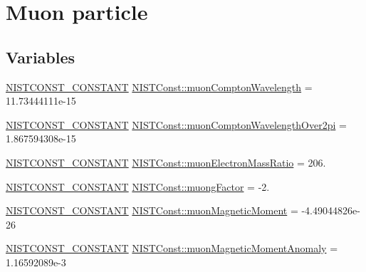\hypertarget{group___n_i_s_t_const-_muon}{}\section{Muon particle}
\label{group___n_i_s_t_const-_muon}
\subsection*{Variables}
\begin{DoxyCompactItemize}
\item 
\mbox{\hyperlink{group___n_i_s_t_const-_macros_ga2b0fc1d7452373f816175dd86ce26729}{N\+I\+S\+T\+C\+O\+N\+S\+T\+\_\+\+C\+O\+N\+S\+T\+A\+NT}} \mbox{\hyperlink{group___n_i_s_t_const-_muon_gafa8e9fc422ec4dab36ec7fed34c4b1b0}{N\+I\+S\+T\+Const\+::muon\+Compton\+Wavelength}} = 11.\+73444111e-\/15
\item 
\mbox{\hyperlink{group___n_i_s_t_const-_macros_ga2b0fc1d7452373f816175dd86ce26729}{N\+I\+S\+T\+C\+O\+N\+S\+T\+\_\+\+C\+O\+N\+S\+T\+A\+NT}} \mbox{\hyperlink{group___n_i_s_t_const-_muon_ga7c9ea95beb94545d850a0ffa09c08630}{N\+I\+S\+T\+Const\+::muon\+Compton\+Wavelength\+Over2pi}} = 1.\+867594308e-\/15
\item 
\mbox{\hyperlink{group___n_i_s_t_const-_macros_ga2b0fc1d7452373f816175dd86ce26729}{N\+I\+S\+T\+C\+O\+N\+S\+T\+\_\+\+C\+O\+N\+S\+T\+A\+NT}} \mbox{\hyperlink{group___n_i_s_t_const-_muon_ga66653799cefd4fb005dabc4be673ad74}{N\+I\+S\+T\+Const\+::muon\+Electron\+Mass\+Ratio}} = 206.
\item 
\mbox{\hyperlink{group___n_i_s_t_const-_macros_ga2b0fc1d7452373f816175dd86ce26729}{N\+I\+S\+T\+C\+O\+N\+S\+T\+\_\+\+C\+O\+N\+S\+T\+A\+NT}} \mbox{\hyperlink{group___n_i_s_t_const-_muon_ga2b85305eb64cc099a63d6637b573630d}{N\+I\+S\+T\+Const\+::muong\+Factor}} = -\/2.
\item 
\mbox{\hyperlink{group___n_i_s_t_const-_macros_ga2b0fc1d7452373f816175dd86ce26729}{N\+I\+S\+T\+C\+O\+N\+S\+T\+\_\+\+C\+O\+N\+S\+T\+A\+NT}} \mbox{\hyperlink{group___n_i_s_t_const-_muon_gac11cf134e94f91150434d6a03a615586}{N\+I\+S\+T\+Const\+::muon\+Magnetic\+Moment}} = -\/4.\+49044826e-\/26
\item 
\mbox{\hyperlink{group___n_i_s_t_const-_macros_ga2b0fc1d7452373f816175dd86ce26729}{N\+I\+S\+T\+C\+O\+N\+S\+T\+\_\+\+C\+O\+N\+S\+T\+A\+NT}} \mbox{\hyperlink{group___n_i_s_t_const-_muon_gac35fe5b30f09c6d7601b1435c6ceafdd}{N\+I\+S\+T\+Const\+::muon\+Magnetic\+Moment\+Anomaly}} = 1.\+16592089e-\/3
\item 

\end{DoxyCompactItemize}
